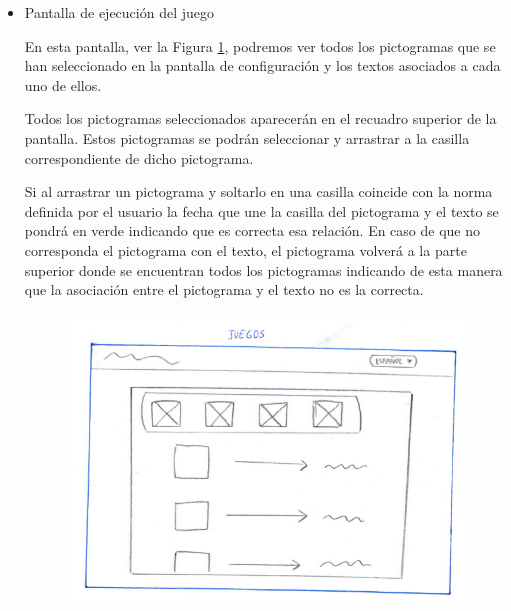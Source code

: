 \begin{itemize}
\begin{itemize}
		
		Las funcionalidades que podemos encontrar en la parte del tablero son las siguientes:
		
		\begin{itemize}
			\item Añadir una nueva casilla: al pulsar sobre este botón se añadirá sobre el tablero sin cuadricular una casilla para insertar un pictograma, imagen, icono o figura geométrica, una flecha y un campo de texto.
			Esto permitirá crear una asociación entre un pictograma y su texto correspondiente para posteriormente ejecutar el juego.
			
			\item Jugar: en la parte superior tendremos un botón que al pulsarlo ejecutará el juego con las normas que estén creadas. Este botón al pulsarlo nos llevará a la pantalla de juego, ver Figura \ref{fig:juegojorge}.
			
		\end{itemize}
		
		\item Pantalla de ejecución del juego
		
		En esta pantalla, ver la Figura \ref{fig:juegojorge},  podremos ver todos los pictogramas que se han seleccionado en la pantalla de configuración y los textos asociados a cada uno de ellos.
		
		Todos los pictogramas seleccionados aparecerán en el recuadro superior de la pantalla. Estos pictogramas se podrán seleccionar y arrastrar a la casilla correspondiente de dicho pictograma.
		
		Si al arrastrar un pictograma y soltarlo en una casilla coincide con la norma definida por el usuario la fecha que une la casilla del pictograma y el texto se pondrá en verde indicando que es correcta esa relación. En caso de que no corresponda el pictograma con el texto, el pictograma volverá a la parte superior donde se encuentran todos los pictogramas indicando de esta manera que la asociación entre el pictograma y el texto no es la correcta.
		
		\begin{figure}[h!]
			\centering
			\includegraphics[width=0.7\linewidth]{Imagenes/Bitmap/juegoJorge}
			\caption{}
			\label{fig:juegojorge}
		\end{figure}
		
	\end{itemize}
	
\end{itemize}






